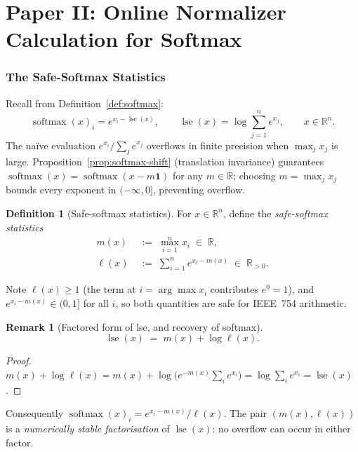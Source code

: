 \documentclass[11pt]{amsart}
\theoremstyle{plain}
\theoremstyle{definition}
\newtheorem{definition}[theorem]{Definition}
\newtheorem{remark}[theorem]{Remark}
\newcommand{\R}{\mathbb{R}}
\newcommand{\softmax}{\operatorname{softmax}}
\newcommand{\logsumexp}{\operatorname{lse}}
\begin{document}
\part{Paper II: Online Normalizer Calculation for Softmax}
\label{part:paper-ii}

\section{The Safe-Softmax Statistics}
\label{sec:safe-softmax}

Recall from Definition~\ref{def:softmax}:
\[
    \softmax(x)_i = e^{x_i - \logsumexp(x)},
    \qquad
    \logsumexp(x) = \log\textstyle\sum_{j=1}^n e^{x_j},
    \qquad x \in \R^n.
\]
The na\"ive evaluation $e^{x_i}/\sum_j e^{x_j}$ overflows in finite
precision when $\max_j x_j$ is large.  Proposition~\ref{prop:softmax-shift}
(translation invariance) guarantees $\softmax(x) = \softmax(x - m\mathbf{1})$
for any $m \in \R$; choosing $m = \max_j x_j$ bounds every exponent in
$(-\infty, 0]$, preventing overflow.

\begin{definition}[Safe-softmax statistics]
\label{def:safe-softmax-stats}
For $x \in \R^n$, define the \emph{safe-softmax statistics}
\begin{align*}
    m(x) &\;:=\; \max_{i=1}^n x_i \;\in\; \R, \\
    \ell(x) &\;:=\; \sum_{i=1}^n e^{x_i - m(x)} \;\in\; \R_{>0}.
\end{align*}
\end{definition}

\noindent Note $\ell(x) \geq 1$ (the term at $i = \arg\max x_i$ contributes
$e^0 = 1$), and $e^{x_i - m(x)} \in (0,1]$ for all $i$, so both quantities
are safe for IEEE~754 arithmetic.

\begin{remark}[Factored form of lse, and recovery of softmax]
\label{rem:stats-to-lse}
\[
    \logsumexp(x) \;=\; m(x) + \log \ell(x).
\]
\begin{proof}
$m(x) + \log\ell(x)
 = m(x) + \log\bigl(e^{-m(x)}\sum_i e^{x_i}\bigr)
 = \log\sum_i e^{x_i}
 = \logsumexp(x)$.
\end{proof}
Consequently $\softmax(x)_i = e^{x_i - m(x)}/\ell(x)$.
The pair $(m(x),\ell(x))$ is a \emph{numerically stable factorisation} of
$\logsumexp(x)$: no overflow can occur in either factor.
\end{remark}
\end{document}
